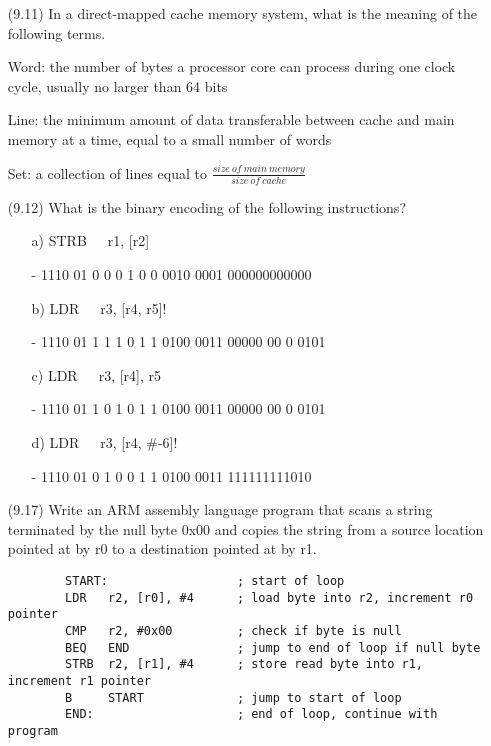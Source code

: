 \documentclass[letterpaper,10pt,titlepage]{article}
\begin{document}
\begin{enumerate}
	\item[(9.11)] In a direct-mapped cache memory system, what is the meaning of the
		following terms.
	\item[\textbullet] Word: the number of bytes a processor core can process during
		one clock cycle, usually no larger than 64 bits
	\item[\textbullet] Line: the minimum amount of data transferable between cache
		and main memory at a time, equal to a small number of words
	\item[\textbullet] Set: a collection of lines equal to $\frac{size\ of\ main\
		memory}{size\ of\ cache}$

	\item[(9.12)] What is the binary encoding of the following instructions?
		\begin{enumerate}
			\item[a)] STRB\ \ \ r1, [r2]
			\item[-] 1110 01 0 0 0 1 0 0 0010 0001 000000000000
			\item[b)] LDR\ \ \ r3, [r4, r5]!
			\item[-] 1110 01 1 1 1 0 1 1 0100 0011 00000 00 0 0101
			\item[c)] LDR\ \ \ r3, [r4], r5
			\item[-] 1110 01 1 0 1 0 1 1 0100 0011 00000 00 0 0101
			\item[d)] LDR\ \ \ r3, [r4, \#-6]!
			\item[-] 1110 01 0 1 0 0 1 1 0100 0011 111111111010
		\end{enumerate}

	\item[(9.17)] Write an ARM assembly language program that scans a string
		terminated by the null byte 0x00 and copies the string from a source
		location pointed at by r0 to a destination pointed at by r1.
		\\
		\begin{verbatim}
		START:                  ; start of loop
		LDR   r2, [r0], #4      ; load byte into r2, increment r0 pointer
		CMP   r2, #0x00         ; check if byte is null
		BEQ   END               ; jump to end of loop if null byte
		STRB  r2, [r1], #4      ; store read byte into r1, increment r1 pointer
		B     START             ; jump to start of loop
		END:                    ; end of loop, continue with program
		\end{verbatim}


\end{enumerate}
\end{document}
